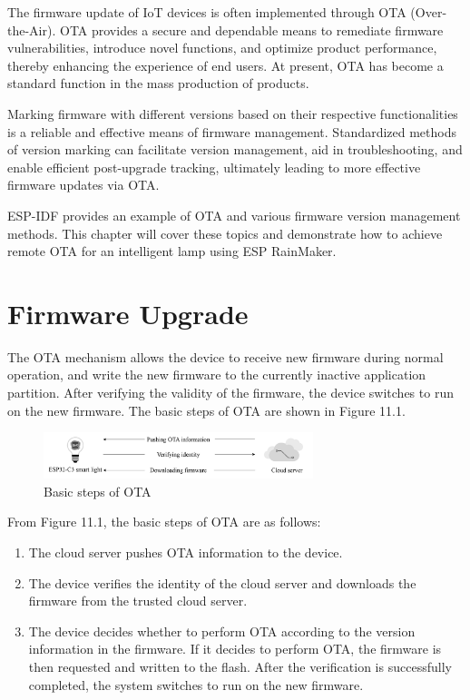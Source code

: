 \documentclass[a4paper,12pt,openany]{book}
\begin{document}
\vspace{36pt}
The firmware update of IoT devices is often implemented through OTA (Over-the-Air). OTA provides a secure and dependable means to remediate firmware vulnerabilities, introduce novel functions, and optimize product performance, thereby enhancing the experience of end users. At present, OTA has become a standard function in the mass production of products.

Marking firmware with different versions based on their respective functionalities is a reliable and effective means of firmware management. Standardized methods of version marking can facilitate version management, aid in troubleshooting, and enable efficient post-upgrade tracking, ultimately leading to more effective firmware updates via OTA.

ESP-IDF provides an example of OTA and various firmware version management methods. This chapter will cover these topics and demonstrate how to achieve remote OTA for an intelligent lamp using ESP RainMaker.

\section{Firmware Upgrade}
The OTA mechanism allows the device to receive new firmware during normal operation, and write the new firmware to the currently inactive application partition. After verifying the validity of the firmware, the device switches to run on the new firmware. The basic steps of OTA are shown in Figure 11.1.

\begin{figure}[!h]
    \centering
    \includegraphics[width=0.7\textwidth]{D11Z/11-1}
    \caption{Basic steps of OTA}
\end{figure}

From Figure 11.1, the basic steps of OTA are as follows:

\begin{enumerate}[label=(\arabic*)]
    \item The cloud server pushes OTA information to the device.
    \item The device verifies the identity of the cloud server and downloads the firmware from the trusted cloud server.
    \item The device decides whether to perform OTA according to the version information in the firmware. If it decides to perform OTA, the firmware is then requested and written to the flash. After the verification is successfully completed, the system switches to run on the new firmware.
\end{enumerate}
\end{document}

